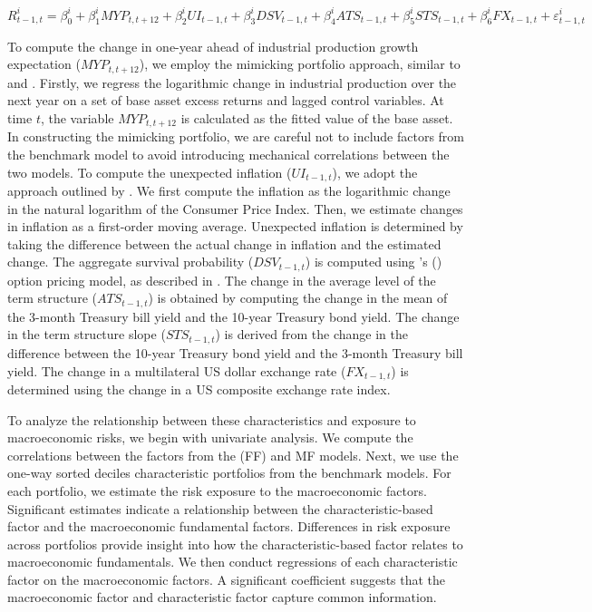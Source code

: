 \documentclass[11pt,halfline,a4paper]{ouparticle}
\begin{document}
\begin{equation}
    R^i_{t-1,t} = \beta^i_0 + \beta^i_1 MYP_{t,t+12} + \beta^i_2 UI_{t-1,t} + \beta^i_3 DSV_{t-1,t} + \beta^i_4 ATS_{t-1,t} + \beta^i_5 STS_{t-1,t} + \beta^i_6 FX_{t-1,t} + \varepsilon^i_{t-1,t}
\end{equation}

To compute the change in one-year ahead of industrial production growth expectation ($MYP_{t,t+12}$), we employ the mimicking portfolio approach, similar to \cite{vassalou2003news} and \cite{aretz2010macroeconomic}. Firstly, we regress the logarithmic change in industrial production over the next year on a set of base asset excess returns and lagged control variables. At time $t$, the variable $MYP_{t,t+12}$ is calculated as the fitted value of the base asset. In constructing the mimicking portfolio, we are careful not to include factors from the benchmark model to avoid introducing mechanical correlations between the two models. To compute the unexpected inflation ($UI_{t-1,t}$), we adopt the approach outlined by \cite{fama1984comparison}. We first compute the inflation as the logarithmic change in the natural logarithm of the Consumer Price Index. Then, we estimate changes in inflation as a first-order moving average. Unexpected inflation is determined by taking the difference between the actual change in inflation and the estimated change. The aggregate survival probability ($DSV_{t-1,t}$) is computed using \citeauthor{merton1974pricing}'s (\citeyear{merton1974pricing}) option pricing model, as described in \cite{vassalou2004default}. The change in the average level of the term structure ($ATS_{t-1,t}$) is obtained by computing the change in the mean of the 3-month Treasury bill yield and the 10-year Treasury bond yield. The change in the term structure slope ($STS_{t-1,t}$) is derived from the change in the difference between the 10-year Treasury bond yield and the 3-month Treasury bill yield. The change in a multilateral US dollar exchange rate ($FX_{t-1,t}$) is determined using the change in a US composite exchange rate index.

To analyze the relationship between these characteristics and exposure to macroeconomic risks, we begin with univariate analysis. We compute the correlations between the factors from the (FF) and MF models. Next, we use the one-way sorted deciles characteristic portfolios from the benchmark models. For each portfolio, we estimate the risk exposure to the macroeconomic factors. Significant estimates indicate a relationship between the characteristic-based factor and the macroeconomic fundamental factors. Differences in risk exposure across portfolios provide insight into how the characteristic-based factor relates to macroeconomic fundamentals. We then conduct regressions of each characteristic factor on the macroeconomic factors. A significant coefficient suggests that the macroeconomic factor and characteristic factor capture common information.
\end{document}

